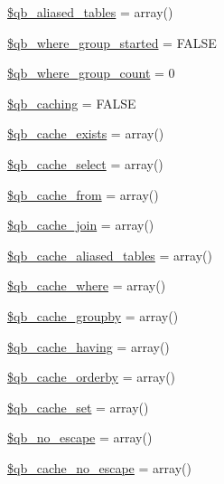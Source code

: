 \begin{DoxyCompactItemize}
\item 
\mbox{\hyperlink{class_c_i___d_b__query__builder_a1a27aa0ceada8a74b23613bf3cd04e65}{\$qb\+\_\+aliased\+\_\+tables}} = array()
\item 
\mbox{\hyperlink{class_c_i___d_b__query__builder_aaae9d24ab424373f1bdbc1b601074433}{\$qb\+\_\+where\+\_\+group\+\_\+started}} = F\+A\+L\+SE
\item 
\mbox{\hyperlink{class_c_i___d_b__query__builder_a2fcbcc620115436314a2d25e7c9ce366}{\$qb\+\_\+where\+\_\+group\+\_\+count}} = 0
\item 
\mbox{\hyperlink{class_c_i___d_b__query__builder_aa1fb22248b06dc9b0b803ba19e54bcbd}{\$qb\+\_\+caching}} = F\+A\+L\+SE
\item 
\mbox{\hyperlink{class_c_i___d_b__query__builder_a895766ccda772ba2c14b755e5eed3615}{\$qb\+\_\+cache\+\_\+exists}} = array()
\item 
\mbox{\hyperlink{class_c_i___d_b__query__builder_a5fd3adf4f7eb7361b707c1172bd9581e}{\$qb\+\_\+cache\+\_\+select}} = array()
\item 
\mbox{\hyperlink{class_c_i___d_b__query__builder_a37229f5eb9d9d16137a76956d12c31a1}{\$qb\+\_\+cache\+\_\+from}} = array()
\item 
\mbox{\hyperlink{class_c_i___d_b__query__builder_ae4641bc6264db400498f5ed8e9ec683e}{\$qb\+\_\+cache\+\_\+join}} = array()
\item 
\mbox{\hyperlink{class_c_i___d_b__query__builder_abcc9582480472e76d30a16183959b60b}{\$qb\+\_\+cache\+\_\+aliased\+\_\+tables}} = array()
\item 
\mbox{\hyperlink{class_c_i___d_b__query__builder_ac325a253ad5ee9ac7fd5cbdad2603de3}{\$qb\+\_\+cache\+\_\+where}} = array()
\item 
\mbox{\hyperlink{class_c_i___d_b__query__builder_af74e5310be3853a3ed7a62666b9a8da3}{\$qb\+\_\+cache\+\_\+groupby}} = array()
\item 
\mbox{\hyperlink{class_c_i___d_b__query__builder_a37ceb9118d6a143e889dca4493a42cb2}{\$qb\+\_\+cache\+\_\+having}} = array()
\item 
\mbox{\hyperlink{class_c_i___d_b__query__builder_a0ff4129b83d9dd14b978c25d0a25a4d1}{\$qb\+\_\+cache\+\_\+orderby}} = array()
\item 
\mbox{\hyperlink{class_c_i___d_b__query__builder_a3f8cb0d781813dbc441265cfc1371a00}{\$qb\+\_\+cache\+\_\+set}} = array()
\item 
\mbox{\hyperlink{class_c_i___d_b__query__builder_a95b3a934937b47f5c90f381cf8a50860}{\$qb\+\_\+no\+\_\+escape}} = array()
\item 
\mbox{\hyperlink{class_c_i___d_b__query__builder_aab4ea89afea227fad65eec8dfb3844b3}{\$qb\+\_\+cache\+\_\+no\+\_\+escape}} = array()
\end{DoxyCompactItemize}
